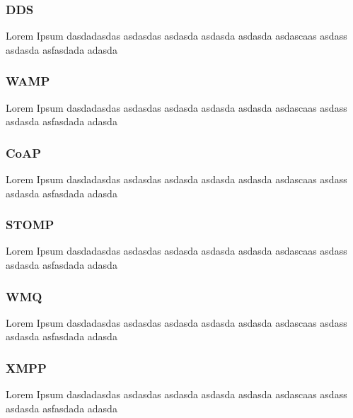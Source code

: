 \subsubsection{DDS}
Lorem Ipsum dasdadasdas asdasdas asdasda asdasda asdasda asdascaas asdass asdasda asfasdada adasda
\subsubsection{WAMP}
Lorem Ipsum dasdadasdas asdasdas asdasda asdasda asdasda asdascaas asdass asdasda asfasdada adasda
\subsubsection{CoAP}
Lorem Ipsum dasdadasdas asdasdas asdasda asdasda asdasda asdascaas asdass asdasda asfasdada adasda
\subsubsection{STOMP}
Lorem Ipsum dasdadasdas asdasdas asdasda asdasda asdasda asdascaas asdass asdasda asfasdada adasda
\subsubsection{WMQ}
Lorem Ipsum dasdadasdas asdasdas asdasda asdasda asdasda asdascaas asdass asdasda asfasdada adasda
\subsubsection{XMPP}
Lorem Ipsum dasdadasdas asdasdas asdasda asdasda asdasda asdascaas asdass asdasda asfasdada adasda